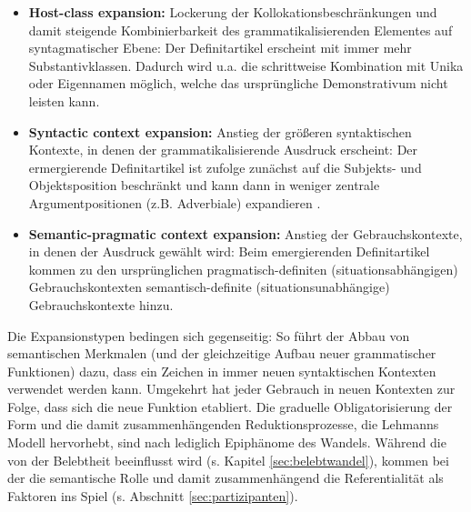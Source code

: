 \begin{itemize}
\item \textbf{Host-class expansion:} Lockerung der Kollokationsbeschränkungen und damit steigende Kombinierbarkeit des grammatikalisierenden Elementes auf syntagmatischer Ebene: Der Definitartikel erscheint mit immer mehr Substantivklassen. Dadurch wird u.a. die schrittweise Kombination mit Unika oder Eigennamen möglich, welche das ursprüngliche Demonstrativum nicht leisten kann. 
\item \textbf{Syntactic context expansion:} Anstieg der größeren syntaktischen Kontexte, in denen der grammatikalisierende Ausdruck erscheint: Der ermergierende Definitartikel ist \textcite[32]{Himmelmann2004} zufolge zunächst auf die Subjekts- und Objektsposition beschränkt und kann dann in weniger zentrale Argumentpositionen (z.B. Adverbiale) expandieren \parencite[s. hierzu auch][]{Himmelmann1998}. 
\item \textbf{Semantic-pragmatic context expansion:} Anstieg der Gebrauchskontexte, in denen der Ausdruck gewählt wird: Beim emergierenden Definitartikel kommen zu den ursprünglichen pragmatisch-definiten
(situationsabhängigen) Gebrauchskontexten semantisch-definite (situationsunabhängige) Gebrauchskontexte hinzu.
\end{itemize}

\noindent
Die Expansionstypen bedingen sich gegenseitig: So führt der Abbau von semantischen Merkmalen (und der gleichzeitige Aufbau neuer grammatischer Funktionen) dazu, dass ein Zeichen in immer neuen syntaktischen Kontexten verwendet werden kann. Umgekehrt hat jeder Gebrauch in neuen Kontexten zur Folge, dass sich die neue Funktion etabliert. Die graduelle Obligatorisierung der Form und die damit zusammenhängenden Reduktionsprozesse, die Lehmanns Modell hervorhebt, sind nach \textcite[33]{Himmelmann2004} lediglich Epiphänome des Wandels. Während die  von der Belebtheit beeinflusst wird (s. Kapitel \ref{sec:belebtwandel}), kommen bei der  die semantische Rolle und damit zusammenhängend die Referentialität als Faktoren ins Spiel (s. Abschnitt \ref{sec:partizipanten}).

